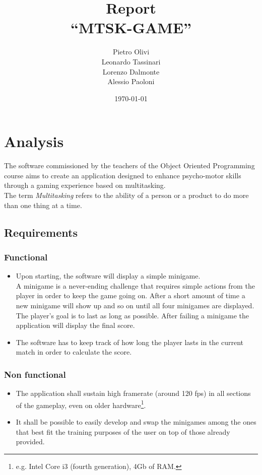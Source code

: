 \documentclass[a4paper,12pt]{report}
\title{Report\\``MTSK-GAME''}
\author{Pietro Olivi\\
Leonardo Tassinari\\
Lorenzo Dalmonte\\
Alessio Paoloni}
\date{\today}
\begin{document}
\maketitle

\tableofcontents

\chapter{Analysis}
The software commissioned by the teachers of the Object Oriented Pro\-gramming course aims to create an application designed to enhance psycho-motor skills through a gaming experience based on multitasking.\\
The term \textit{Multitasking} refers to the ability of a person or a product to do more than one thing at a time.

\section{Requirements}
\subsection*{Functional}
\begin{itemize}
	\item Upon starting, the software will display a simple minigame.\\
	A minigame is a never-ending challenge that requires simple actions from the player in order to keep the game going on.
	After a short amount of time a new minigame will show up and so on until all four minigames are displayed.
	The player's goal is to last as long as possible. After failing a minigame the application will display the final score.
	\item The software has to keep track of how long the player lasts in the current match in order to calculate the score.
\end{itemize}

\subsection*{Non functional}
\begin{itemize}
	\item The application shall sustain high framerate (around 120 fps) in all sections of the gameplay, even on older hardware\footnote{e.g. Intel Core i3 (fourth generation), 4Gb of RAM.}.
	\item It shall be possible to easily develop and swap the minigames among the ones that best fit the training purposes of the user on top of those already provided. 
\end{itemize}
\end{document}
